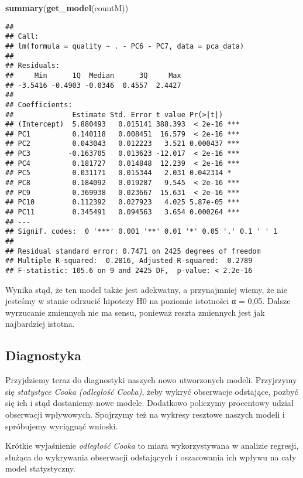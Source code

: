 \documentclass[
]{article}
\newenvironment{Shaded}{\begin{snugshade}}{\end{snugshade}}
\newcommand{\FunctionTok}[1]{\textcolor[rgb]{0.13,0.29,0.53}{\textbf{#1}}}
\newcommand{\NormalTok}[1]{#1}
\begin{document}
\begin{Shaded}
\begin{Highlighting}[]
\FunctionTok{summary}\NormalTok{(}\FunctionTok{get\_model}\NormalTok{(countM))}
\end{Highlighting}
\end{Shaded}

\begin{verbatim}
## 
## Call:
## lm(formula = quality ~ . - PC6 - PC7, data = pca_data)
## 
## Residuals:
##     Min      1Q  Median      3Q     Max 
## -3.5416 -0.4903 -0.0346  0.4557  2.4427 
## 
## Coefficients:
##              Estimate Std. Error t value Pr(>|t|)    
## (Intercept)  5.880493   0.015141 388.393  < 2e-16 ***
## PC1          0.140118   0.008451  16.579  < 2e-16 ***
## PC2          0.043043   0.012223   3.521 0.000437 ***
## PC3         -0.163705   0.013623 -12.017  < 2e-16 ***
## PC4          0.181727   0.014848  12.239  < 2e-16 ***
## PC5          0.031171   0.015344   2.031 0.042314 *  
## PC8          0.184092   0.019287   9.545  < 2e-16 ***
## PC9          0.369938   0.023667  15.631  < 2e-16 ***
## PC10         0.112392   0.027923   4.025 5.87e-05 ***
## PC11         0.345491   0.094563   3.654 0.000264 ***
## ---
## Signif. codes:  0 '***' 0.001 '**' 0.01 '*' 0.05 '.' 0.1 ' ' 1
## 
## Residual standard error: 0.7471 on 2425 degrees of freedom
## Multiple R-squared:  0.2816, Adjusted R-squared:  0.2789 
## F-statistic: 105.6 on 9 and 2425 DF,  p-value: < 2.2e-16
\end{verbatim}

Wynika stąd, że ten model także jest adekwatny, a przynajmniej wiemy, że
nie jesteśmy w stanie odrzucić hipotezy H0 na poziomie istotności α =
0,05. Dalsze wyrzucanie zmiennych nie ma sensu, ponieważ reszta
zmiennych jest jak najbardziej istotna.

\subsection{Diagnostyka}\label{diagnostyka}

Przyjdziemy teraz do diagnostyki naszych nowo utworzonych modeli.
Przyjrzymy się \emph{statystyce Cooka (odległość Cooka)}, żeby wykryć
obserwacje odstające, pozbyć się ich i stąd dostaniemy nowe modele.
Dodatkowo policzymy procentowy udział obserwacji wpływowych. Spojrzymy
też na wykresy resztowe naszych modeli i spróbujemy wyciągnąć wnioski.

Krótkie wyjaśnienie \emph{odległość Cooka} to miara wykorzystywana w
analizie regresji, służąca do wykrywania obserwacji odstających i
oszacowania ich wpływu na cały model statystyczny.
\end{document}
